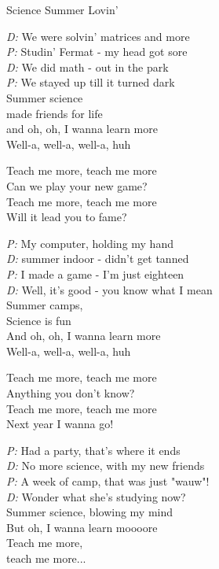 \begin{song}{Science Summer Lovin'}
  \begin{SBVerse}
    \emph{D:} We were solvin' matrices and more\\
    \emph{P:} Studin' Fermat - my head got sore\\
    \emph{D:} We did math - out in the park\\
    \emph{P:} We stayed up till it turned dark\\
    \medskip
    Summer science\\
    made friends for life\\
    and oh, oh, I wanna learn more\\
    Well-a, well-a, well-a, huh
  \end{SBVerse}

  \begin{SBChorus}
    Teach me more, teach me more\\
    Can we play your new game?\\
    Teach me more, teach me more\\
    Will it lead you to fame?
  \end{SBChorus}

  \begin{SBVerse}
    \emph{P:} My computer, holding my hand\\
    \emph{D:} summer indoor - didn't get tanned\\
    \emph{P:} I made a game - I'm just eighteen\\
    \emph{D:} Well, it's good - you know what I mean\\
    \medskip
    Summer camps,\\
    Science is fun\\
    And oh, oh, I wanna learn more\\
    Well-a, well-a, well-a, huh
  \end{SBVerse}

  \begin{SBChorus}
    Teach me more, teach me more\\
    Anything you don't know?\\
    Teach me more, teach me more\\
    Next year I wanna go!
  \end{SBChorus}

  \begin{SBVerse}
    \emph{P:} Had a party, that's where it ends\\
    \emph{D:} No more science, with my new friends\\
    \emph{P:} A week of camp, that was just "wauw"!\\
    \emph{D:} Wonder what she's studying now?\\
    \medskip
    Summer science, blowing my mind\\
    But oh, I wanna learn moooore\\
    \medskip
    Teach me more,\\
    teach me more...
  \end{SBVerse}
\end{song}